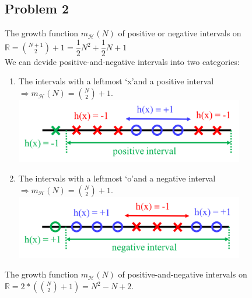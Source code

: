 \documentclass[12pt, a4paper]{article}
\begin{document}
\begin{CJK}{UTF8}{bkai}
	\section*{Problem 2}
		The growth function $m_\mathcal{H}(N)$ of positive or negative intervals on $\mathbb{R} = \binom{N+1}{2}+1 = \dfrac{1}{2}N^2+\dfrac{1}{2}N+1$ \\
		We can devide positive-and-negative intervals into two categories:
		\begin{enumerate}
			\item
				The intervals with a leftmost \lq x\rq \space and a positive interval
				$\Rightarrow m_\mathcal{H}(N)= \binom{N}{2}+1$. \\
				\includegraphics[width=10cm, keepaspectratio=true]{positive.png}
			\item
				The intervals with a leftmost \lq o\rq \space and a negative interval
				$\Rightarrow m_\mathcal{H}(N)= \binom{N}{2}+1$.\\
				\includegraphics[width=10cm, keepaspectratio=true]{negative.png}
		\end{enumerate}
		The growth function $m_\mathcal{H}(N)$ of positive-and-negative intervals on $\mathbb{R} = 2*(\binom{N}{2}+1) = N^2-N+2$.


\end{CJK}
\end{document}
